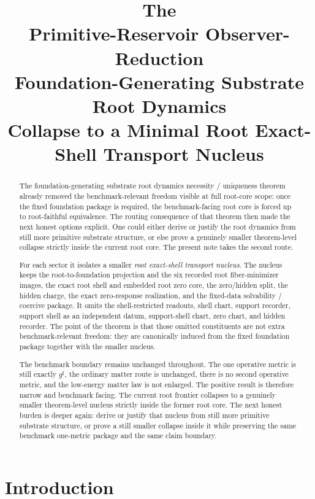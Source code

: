 \documentclass[11pt]{article}
\title{\textbf{The \TheoryName{}}\\[0.4em]
\large Primitive-Reservoir Observer-Reduction\\
\large Foundation-Generating Substrate Root Dynamics\\
\large Collapse to a Minimal Root Exact-Shell Transport Nucleus}
\author{}
\date{}
\newcommand{\CompletedMetric}{g^{\sharp}}
\begin{document}
\maketitle

\begin{abstract}
The foundation-generating substrate root dynamics necessity / uniqueness theorem already removed the benchmark-relevant freedom visible at full root-core scope: once the fixed foundation package is required, the benchmark-facing root core is forced up to root-faithful equivalence. The routing consequence of that theorem then made the next honest options explicit. One could either derive or justify the root dynamics from still more primitive substrate structure, or else prove a genuinely smaller theorem-level collapse strictly inside the current root core. The present note takes the second route.

For each sector it isolates a smaller \emph{root exact-shell transport nucleus}. The nucleus keeps the root-to-foundation projection and the six recorded root fiber-minimizer images, the exact root shell and embedded root zero core, the zero/hidden split, the hidden charge, the exact zero-response realization, and the fixed-data solvability / coercive package. It omits the shell-restricted readouts, shell chart, support recorder, support shell as an independent datum, support-shell chart, zero chart, and hidden recorder. The point of the theorem is that those omitted constituents are not extra benchmark-relevant freedom: they are canonically induced from the fixed foundation package together with the smaller nucleus.

The benchmark boundary remains unchanged throughout. The one operative metric is still exactly \(\CompletedMetric\), the ordinary matter route is unchanged, there is no second operative metric, and the low-energy matter law is not enlarged. The positive result is therefore narrow and benchmark facing. The current root frontier collapses to a genuinely smaller theorem-level nucleus strictly inside the former root core. The next honest burden is deeper again: derive or justify that nucleus from still more primitive substrate structure, or prove a still smaller collapse inside it while preserving the same benchmark one-metric package and the same claim boundary.
\end{abstract}

\section{Introduction}
\end{document}
